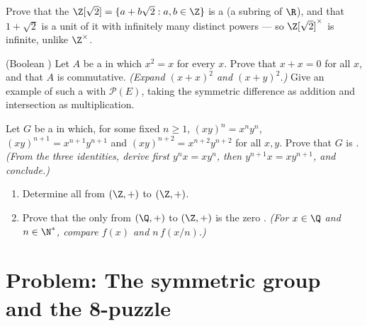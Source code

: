 \begin{exercise}[$\star\star$]\label{exo:b1:structures:9}
Prove that the  $\Z[\sqrt 2] = \{a + b\sqrt 2 : a, b \in \Z\}$ is
a  (a subring of $\R$), and that $1 + \sqrt 2$ is a unit of it
with infinitely many distinct powers --- so $\Z[\sqrt 2]^\times$ is
infinite, unlike $\Z^\times$.
\end{exercise}

\begin{exercise}[$\star\star\star$]\label{exo:b1:structures:10}
(Boolean ) Let $A$ be a  in which $x^2 = x$ for every $x$.
Prove that $x + x = 0$ for all $x$, and that $A$ is commutative.
\emph{(Expand $(x+x)^2$ and $(x+y)^2$.)} Give an example of such a
 with $\mathcal{P}(E)$, taking the symmetric difference as
addition and intersection as multiplication.
\end{exercise}

\begin{exercise}[$\star\star\star$]\label{exo:b1:structures:11}
Let $G$ be a  in which, for some fixed $n \geq 1$, $(xy)^n =
x^n y^n$, $(xy)^{n+1} = x^{n+1}y^{n+1}$ and $(xy)^{n+2} =
x^{n+2}y^{n+2}$ for all $x, y$. Prove that $G$ is .
\emph{(From the three identities, derive first $y^n x = x y^n$, then
$y^{n+1} x = x y^{n+1}$, and conclude.)}
\end{exercise}

\begin{exercise}[$\star\star$]\label{exo:b1:structures:12}
\begin{enumerate}
  \item Determine all   from $(\Z, +)$ to $(\Z, +)$.
  \item Prove that the only   from $(\Q, +)$ to
        $(\Z, +)$ is the zero . \emph{(For $x \in \Q$ and
        $n \in \N^*$, compare $f(x)$ and $n\,f(x/n)$.)}
\end{enumerate}
\end{exercise}

\section{Problem: The symmetric group and the 8-puzzle}

